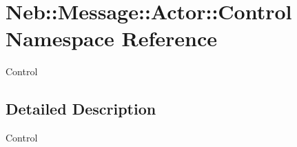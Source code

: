 \hypertarget{namespaceNeb_1_1Message_1_1Actor_1_1Control}{\section{Neb\-:\-:Message\-:\-:Actor\-:\-:Control Namespace Reference}
\label{namespaceNeb_1_1Message_1_1Actor_1_1Control}
}


Control  




\subsection{Detailed Description}
Control 